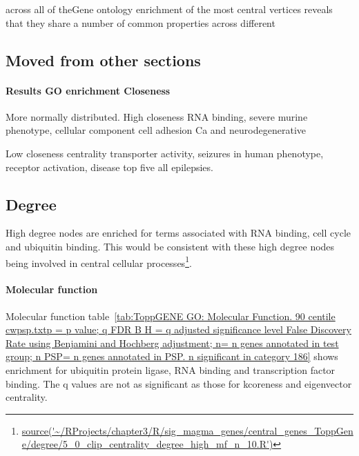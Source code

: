 across all of theGene ontology enrichment of the most central vertices reveals that they share a number of common properties across different





\subsection{Moved from other sections}
\paragraph{Results GO enrichment Closeness}
More normally distributed.
High closeness RNA binding, severe murine phenotype, cellular component cell adhesion
Ca and neurodegenerative

Low closeness centrality transporter activity, seizures in human phenotype, receptor activation, disease top five all epilepsies. 

\subsection{Degree}
High degree nodes are enriched for terms associated with RNA binding, cell cycle and ubiquitin binding. This would be consistent with these high degree nodes being involved in central cellular processes\footnote{\url{source('~/RProjects/chapter3/R/sig_magma_genes/central_genes_ToppGene/degree/5_0_clip_centrality_degree_high_mf_n_10.R')}}.

\paragraph{Molecular function}
Molecular function table~\ref{tab:ToppGENE GO: Molecular Function. 90 centile cwpsp.txtp = p value; q FDR B H = q adjusted significance level False Discovery Rate using Benjamini and Hochberg adjustment; n= n genes annotated in test group; n PSP= n genes annotated in PSP. n significant in category 186} shows enrichment for ubiquitin protein ligase, RNA binding and transcription factor binding. The q values are not as significant as those for kcoreness and eigenvector centrality.




